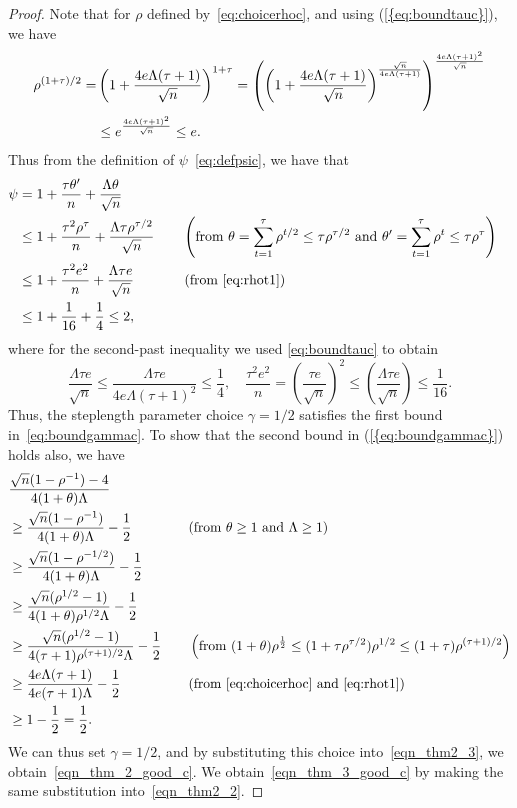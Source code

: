 \documentclass{siamltex}
\begin{document}
\begin{proof}
Note that for $\rho$ defined by~\eqref{eq:choicerhoc}, and using
{(\ref{{eq:boundtauc}})}, we have
\begin{align} 
\nonumber
\rho^{(1+\tau)/2}= & \left(1+ {4e\Lambda (\tau + 1) \over
  \sqrt{n}}\right)^{1+\tau} =  \left(\left(1+ {4e\Lambda (\tau + 1) \over
  \sqrt{n}}\right)^{\sqrt{n}\over 4e\Lambda(\tau +1)}\right)^{{4e\Lambda (\tau+1)^2 \over \sqrt{n}}} 
\\ &
\leq e^{{4e\Lambda(\tau+1)^2
    \over \sqrt{n}}} \leq e.
\label{eq:rhot1}
\end{align}
Thus from the definition of $\psi$~\eqref{eq:defpsic}, we have that
\begin{alignat*}{2}
\psi & = 1+\frac{\tau\theta'}{n} + \frac{\Lambda\theta}{\sqrt{n}} 
\\ \nonumber & \leq 
1+\frac{\tau^2\rho^{\tau}}{n} + \frac{\Lambda\tau\rho^{\tau/2}}{\sqrt{n}} \quad 
&& \left(\text{from $\theta = \sum_{t=1}^{\tau}\rho^{t/2} \leq \tau \rho^{\tau/2}$ and $\theta' = \sum_{t=1}^{\tau}\rho^{t} \leq \tau \rho^{\tau}$}\right)
\\ & \leq
1+\frac{\tau^2e^2}{n} + \frac{\Lambda\tau e}{\sqrt{n}} && \left(\text{from \eqref{eq:rhot1}}\right)
\\
&\leq
1+{1\over 16} + {1\over 4} \leq 2,
\end{alignat*}
where for the second-past inequality we used \eqref{eq:boundtauc} to obtain
\[
\frac{\Lambda \tau e}{\sqrt{n}} \le \frac{\Lambda \tau e}{4e \Lambda (\tau+1)^2} \le \frac14, \quad
\frac{\tau^2 e^2}{n} = \left( \frac{\tau e}{\sqrt{n}} \right)^2 \le
\left( \frac{\Lambda \tau e}{\sqrt{n}} \right) \le \frac{1}{16}.
\]
Thus, the steplength parameter choice $\gamma=1/2$ satisfies the first
bound in~\eqref{eq:boundgammac}. To show that the second bound in
{(\ref{{eq:boundgammac}})} holds also, we have
\begin{alignat*}{2}
&\frac{\sqrt{n}(1-\rho^{-1})-4}{4(1+\theta){\Lambda}}  &&
\\ &
\geq \frac{\sqrt{n}(1-\rho^{-1})}{4(1+\theta){\Lambda}} - {1\over 2}  
&& \text{(from $\theta \geq 1$ and $\Lambda \geq 1$)}
\\ 
&
\geq \frac{\sqrt{n}(1-\rho^{-1/2})}{4(1+\theta){\Lambda}} - {1\over 2}  
&&
\\ 
&
\geq \frac{\sqrt{n}(\rho^{1/2}-1)}{4(1+\theta)\rho^{1/2}{\Lambda}} - {1\over 2}
\\ &
\geq \frac{\sqrt{n}(\rho^{1/2}-1)}{4(\tau+1)\rho^{(\tau+1)/2}{\Lambda}} - {1\over 2}
\quad && \left(\text{from $(1+\theta)\rho^{1\over 2}\leq (1+\tau\rho^{\tau/2})\rho^{1/2} \leq (1+\tau)\rho^{(\tau+1)/2}$}\right)
\\ &
\geq \frac{4e\Lambda(\tau+1)}{4e(\tau+1){\Lambda}} - {1\over 2} 
&& \text{(from \eqref{eq:choicerhoc} and \eqref{eq:rhot1})}
\\ &
\geq 1 - {1\over 2} ={1\over 2}. &&
\end{alignat*}
We can thus set $\gamma=1/2$, and by substituting this choice
into~\eqref{eqn_thm2_3}, we obtain~\eqref{eqn_thm_2_good_c}. We
obtain~\eqref{eqn_thm_3_good_c} by making the same substitution
into~\eqref{eqn_thm2_2}.
\end{proof}

{


}
\end{document}
